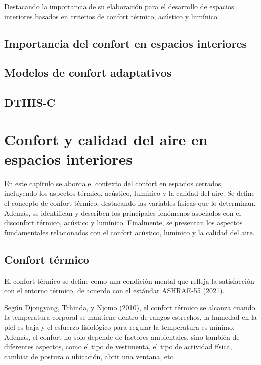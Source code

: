 \documentclass[
  letterpaper,
]{scrbook}
\begin{document}
Destacando la importancia de su elaboración para el desarrollo de
espacios interiores basados en criterios de confort térmico, acústico y
lumínico.

\section{Importancia del confort en espacios
interiores}\label{importancia-del-confort-en-espacios-interiores}

\section{Modelos de confort
adaptativos}\label{modelos-de-confort-adaptativos}

\section{DTHIS-C}\label{dthis-c}


\chapter{Confort y calidad del aire en espacios
interiores}\label{confort-y-calidad-del-aire-en-espacios-interiores}

En este capítulo se aborda el contexto del confort en espacios cerrados,
incluyendo los aspectos térmico, acústico, lumínico y la calidad del
aire. Se define el concepto de confort térmico, destacando las variables
físicas que lo determinan. Además, se identifican y describen los
principales fenómenos asociados con el disconfort térmico, acústico y
lumínico. Finalmente, se presentan los aspectos fundamentales
relacionados con el confort acústico, lumínico y la calidad del aire.

\section{Confort térmico}\label{confort-tuxe9rmico}

El confort térmico se define como una condición mental que refleja la
satisfacción con el entorno térmico, de acuerdo con el estándar
ASHRAE-55 (2021).

Según Djongyang, Tchinda, y Njomo (2010), el confort térmico se alcanza
cuando la temperatura corporal se mantiene dentro de rangos estrechos,
la humedad en la piel es baja y el esfuerzo fisiológico para regular la
temperatura es mínimo. Además, el confort no solo depende de factores
ambientales, sino también de diferentes aspectos, como el tipo de
vestimenta, el tipo de actividad física, cambiar de postura o ubicación,
abrir una ventana, etc.
\end{document}

